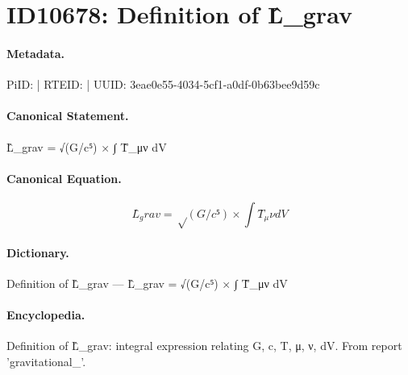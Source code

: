 \section*{ID10678: Definition of L̂\_grav}
\paragraph{Metadata.}
PiID:  | RTEID:  | UUID: 3eae0e55-4034-5cf1-a0df-0b63bee9d59c

\paragraph{Canonical Statement.}
L̂\_grav = √(G/c⁵) × ∫ T̂\_μν dV

\paragraph{Canonical Equation.}
\[
L̂_grav = √(G/c⁵) × ∫ T̂_μν dV
\]

\paragraph{Dictionary.}
Definition of L̂\_grav — L̂\_grav = √(G/c⁵) × ∫ T̂\_μν dV

\paragraph{Encyclopedia.}
Definition of L̂\_grav: integral expression relating G, c, T, μ, ν, dV. From report 'gravitational\_'.
